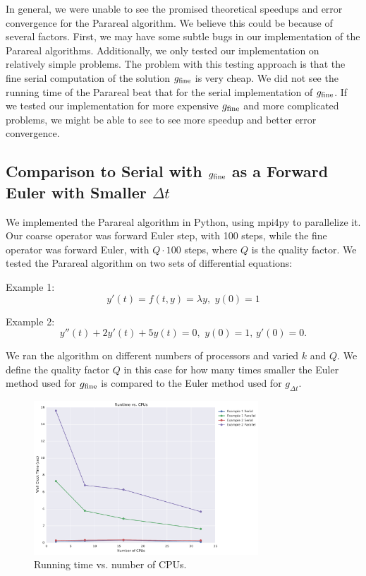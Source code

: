 \documentclass[letterpaper,12pt]{article}
\begin{document}
In general, we were unable to see the promised theoretical speedups and error
convergence for the Parareal algorithm. We believe this could be because of
several factors. First, we may have some subtle bugs in our implementation of
the Parareal algorithms. Additionally, we only tested our implementation on
relatively simple problems. The problem with this testing approach is that the
fine serial computation of the solution $g_{\textnormal{fine}}$ is very cheap.
We did not see the running time of the Parareal beat that for the serial
implementation of $g_{\textnormal{fine}}$. If we tested our implementation for
more expensive $g_{\textnormal{fine}}$ and more complicated problems, we might
be able to see to see more speedup and better error convergence. 

\subsection{Comparison to Serial with $g_{\textnormal{fine}}$ as a Forward Euler
with Smaller $\Delta t$}

We implemented the Parareal algorithm in Python, using mpi4py to parallelize it.
Our coarse operator was forward Euler step, with 100 steps, while the fine
operator was forward Euler, with $Q \cdot 100$ steps, where $Q$ is the quality
factor. We tested the Parareal algorithm on two sets of differential equations:

Example 1:
\[
y'(t) = f(t, y) = \lambda y, \, \, y(0) = 1
\]

Example 2:
\[
y''(t) + 2y'(t) + 5y(t) = 0, \, \, y(0) = 1, \, y'(0) = 0.
\]

We ran the algorithm on different numbers of processors and varied $k$ and $Q$.
We define the quality factor $Q$ in this case for how many times smaller the
Euler method used for $g_{\textnormal{fine}}$ is compared to the Euler method
used for $g_{\Delta t}$.

\begin{figure}[H]
\begin{center}
\includegraphics[width=0.75\textwidth]{data/runtime_vs_cpus.pdf}
\caption{Running time vs. number of CPUs.}
\label{fig:run_v_cpu}
\end{center}
\end{figure}
\end{document}
